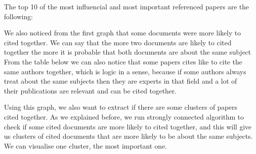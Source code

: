 \documentclass[journal,twocolumn]{IEEEtran}
\begin{document}
    The top 10 of the most influencial and most important referenced papers
are the following:


    \begin{figure}
        \begin{center}\end{center}
        \caption{}
        \label{}
    \end{figure}
    
    We also noticed from the first graph that some documents were more
likely to cited together. We can say that the more two documents are
likely to cited together the more it is probable that both documents are
about the same subject From the table below we can also notice that some
papers cites like to cite the same authors together, which is logic in a
sense, because if some authors always treat about the same subjects then
they are experts in that field and a lot of their publications are
relevant and can be cited together.


    \begin{figure}
        \begin{center}\end{center}
        \caption{}
        \label{}
    \end{figure}
    
    Using this graph, we also want to extract if there are some clusters of
papers cited together. As we explained before, we run strongly connected
algorithm to check if some cited documents are more likely to cited
together, and this will give us clusters of cited documents that are
more likely to be about the same subjects. We can visualise one cluster,
the most important one.
\end{document}
